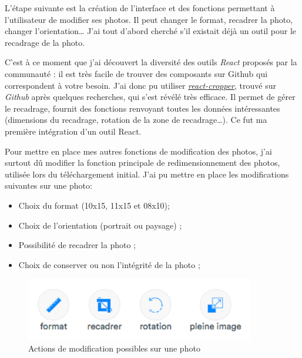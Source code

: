 \documentclass[12pt,a4paper]{article}
\providecommand{\tightlist}{%
  \setlength{\itemsep}{0pt}\setlength{\parskip}{0pt}}
\begin{document}
  \bigskip

  L'étape suivante est la création de l'interface et des fonctions
  permettant à l'utilisateur de modifier ses photos. Il peut changer le
  format, recadrer la photo, changer l'orientation\ldots{} J'ai tout
  d'abord cherché s'il existait déjà un outil pour le recadrage de la
  photo.

  \bigskip

  C'est à ce moment que j'ai découvert la diversité des outils
  \emph{React} proposés par la communauté : il est très facile de trouver
  des composants sur Github qui correspondent à votre besoin. J'ai donc pu
  utiliser
  \href{https://github.com/roadmanfong/react-cropper}{\emph{react-cropper}},
  trouvé sur \emph{Github} après quelques recherches, qui s'est révélé
  très efficace. Il permet de gérer le recadrage, fournit des fonctions
  renvoyant toutes les données intéressantes (dimensions du recadrage,
  rotation de la zone de recadrage\ldots{}). Ce fut ma première
  intégration d'un outil React.

  \bigskip

  Pour mettre en place mes autres fonctions de modification des photos,
  j'ai surtout dû modifier la fonction principale de redimensionnement des
  photos, utilisée lors du téléchargement initial. J'ai pu mettre en place
  les modifications suivantes sur une photo:

  \begin{itemize}
  \tightlist
  \item
    Choix du format (10x15, 11x15 et 08x10);
  \item
    Choix de l'orientation (portrait ou paysage) ;
  \item
    Possibilité de recadrer la photo ;
  \item
    Choix de conserver ou non l'intégrité de la photo ;
  \end{itemize}

  \begin{figure}[h]
    \centering
    \includegraphics[width=10cm]{figures/photolix-1.png}
    \caption{Actions de modification possibles sur une photo}
  \end{figure}

  \bigskip
\end{document}
